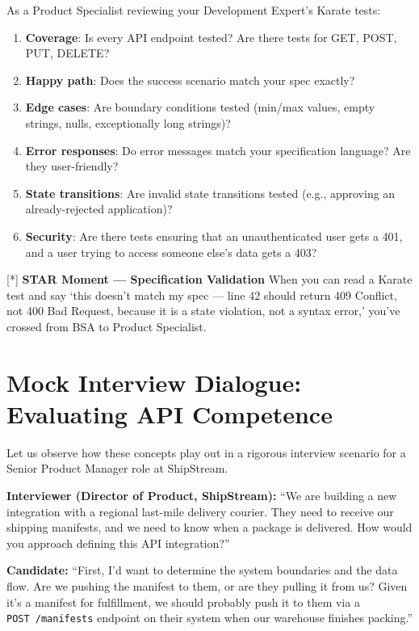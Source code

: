 \documentclass[
  11pt,
  openany,
  oneside]{book}
\providecommand{\tightlist}{%
  \setlength{\itemsep}{0pt}\setlength{\parskip}{0pt}}
\renewenvironment{quote}{\begin{customquote}}{\end{customquote}}
\begin{document}
As a Product Specialist reviewing your Development Expert's Karate
tests:

\begin{enumerate}
\def\labelenumi{\arabic{enumi}.}
\tightlist
\item
  \textbf{Coverage}: Is every API endpoint tested? Are there tests for
  GET, POST, PUT, DELETE?
\item
  \textbf{Happy path}: Does the success scenario match your spec
  exactly?
\item
  \textbf{Edge cases}: Are boundary conditions tested (min/max values,
  empty strings, nulls, exceptionally long strings)?
\item
  \textbf{Error responses}: Do error messages match your specification
  language? Are they user-friendly?
\item
  \textbf{State transitions}: Are invalid state transitions tested
  (e.g., approving an already-rejected application)?
\item
  \textbf{Security}: Are there tests ensuring that an unauthenticated
  user gets a 401, and a user trying to access someone else's data gets
  a 403?
\end{enumerate}

\begin{quote}
{[}*{]} \textbf{STAR Moment --- Specification Validation} When you can
read a Karate test and say `this doesn't match my spec --- line 42
should return 409 Conflict, not 400 Bad Request, because it is a state
violation, not a syntax error,' you've crossed from BSA to Product
Specialist.
\end{quote}

\section{Mock Interview Dialogue: Evaluating API
Competence}\label{mock-interview-dialogue-evaluating-api-competence}

Let us observe how these concepts play out in a rigorous interview
scenario for a Senior Product Manager role at ShipStream.

\textbf{Interviewer (Director of Product, ShipStream):} ``We are
building a new integration with a regional last-mile delivery courier.
They need to receive our shipping manifests, and we need to know when a
package is delivered. How would you approach defining this API
integration?''

\textbf{Candidate:} ``First, I'd want to determine the system boundaries
and the data flow. Are we pushing the manifest to them, or are they
pulling it from us? Given it's a manifest for fulfillment, we should
probably push it to them via a \texttt{POST\ /manifests} endpoint on
their system when our warehouse finishes packing.''
\end{document}
